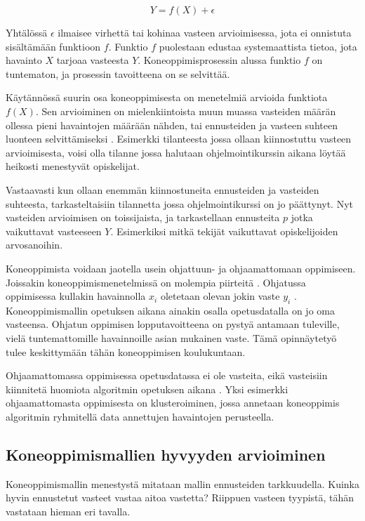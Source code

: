\documentclass[finnish,twoside,openright]{HYgraduMLDS}
\begin{document}
\begin{equation}
    Y = f(X) + \epsilon
\end{equation}

Yhtälössä $\epsilon$ ilmaisee virhettä tai kohinaa vasteen arvioimisessa, jota ei onnistuta sisältämään funktioon $f$. Funktio $f$ puolestaan edustaa systemaattista tietoa, jota havainto $X$ tarjoaa vasteesta $Y$. Koneoppimisprosessin alussa funktio $f$ on tuntematon, ja prosessin tavoitteena on se selvittää.

Käytännössä suurin osa koneoppimisesta on menetelmiä arvioida funktiota $f(X)$. Sen arvioiminen on mielenkiintoista muun muassa vasteiden määrän ollessa pieni havaintojen määrään nähden, tai ennusteiden ja vasteen suhteen luonteen selvittämiseksi \cite{james2013ISLR}. Esimerkki tilanteesta jossa ollaan kiinnostuttu vasteen arvioimisesta, voisi olla tilanne jossa halutaan ohjelmointikurssin aikana löytää heikosti menestyvät opiskelijat.

Vastaavasti kun ollaan enemmän kiinnostuneita ennusteiden ja vasteiden suhteesta, tarkasteltaisiin tilannetta jossa ohjelmointikurssi on jo päättynyt. Nyt vasteiden arvioimisen on toissijaista, ja tarkastellaan ennusteita $p$ jotka vaikuttavat vasteeseen $Y$. Esimerkiksi mitkä tekijät vaikuttavat opiskelijoiden arvosanoihin.

Koneoppimista voidaan jaotella usein ohjattuun- ja ohjaamattomaan oppimiseen. Joissakin koneoppimismenetelmissä on molempia piirteitä \cite{james2013ISLR}. Ohjatussa oppimisessa kullakin havainnolla $x_i$ oletetaan olevan jokin vaste $y_i$ \cite{james2013ISLR}. Koneoppimismallin opetuksen aikana ainakin osalla opetusdatalla on jo oma vasteensa. Ohjatun oppimisen lopputavoitteena on pystyä antamaan tuleville, vielä tuntemattomille havainnoille asian mukainen vaste. Tämä opinnäytetyö tulee keskittymään tähän koneoppimisen koulukuntaan.

Ohjaamattomassa oppimisessa opetusdatassa ei ole vasteita, eikä vasteisiin kiinnitetä huomiota algoritmin opetuksen aikana \cite{james2013ISLR}. Yksi esimerkki ohjaamattomasta oppimisesta on klusteroiminen, jossa annetaan koneoppimis algoritmin ryhmitellä data annettujen havaintojen perusteella.


\subsection{Koneoppimismallien hyvyyden arvioiminen}

Koneoppimismallin menestystä mitataan mallin ennusteiden tarkkuudella. Kuinka hyvin ennustetut vasteet vastaa aitoa vastetta? Riippuen vasteen tyypistä, tähän vastataan hieman eri tavalla.
\end{document}
